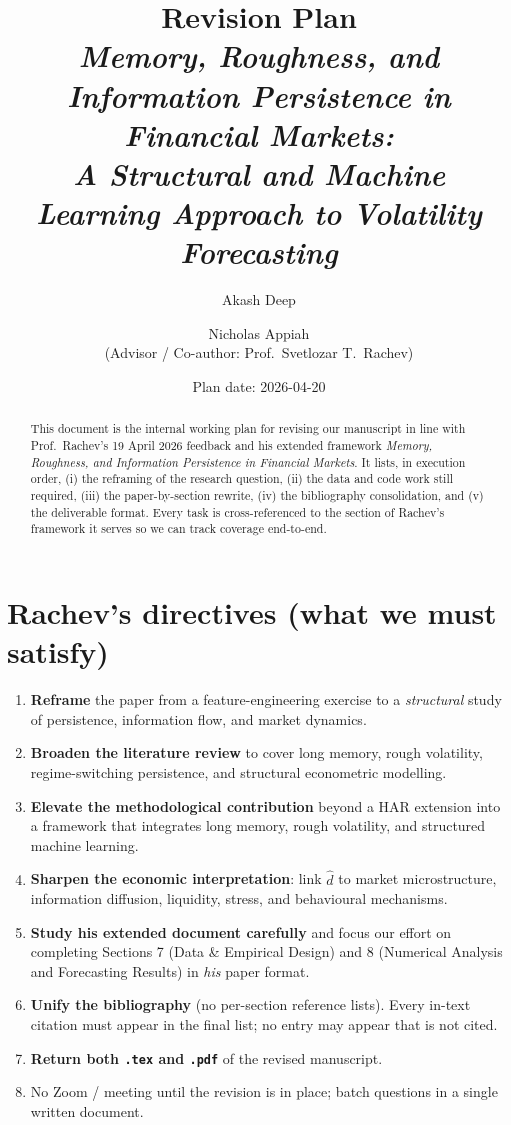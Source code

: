 \documentclass[11pt,a4paper]{article}
\title{\textbf{Revision Plan}\\[4pt]
\emph{Memory, Roughness, and Information Persistence in Financial Markets:\\
A Structural and Machine Learning Approach to Volatility Forecasting}}
\author{Akash Deep \and Nicholas Appiah \\[4pt]
\small (Advisor / Co-author: Prof.\ Svetlozar T.\ Rachev)}
\date{Plan date: 2026-04-20}
\begin{document}
\maketitle

\begin{abstract}
\noindent This document is the internal working plan for revising our manuscript in line
with Prof.\ Rachev's 19 April 2026 feedback and his extended framework
\emph{Memory, Roughness, and Information Persistence in Financial Markets}.
It lists, in execution order, (i) the reframing of the research question,
(ii) the data and code work still required, (iii) the paper-by-section
rewrite, (iv) the bibliography consolidation, and (v) the deliverable format.
Every task is cross-referenced to the section of Rachev's framework it
serves so we can track coverage end-to-end.
\end{abstract}

\tableofcontents

\section{Rachev's directives (what we must satisfy)}

\begin{enumerate}
  \item \textbf{Reframe} the paper from a feature-engineering exercise to a
  \emph{structural} study of persistence, information flow, and market
  dynamics.
  \item \textbf{Broaden the literature review} to cover long memory, rough
  volatility, regime-switching persistence, and structural econometric modelling.
  \item \textbf{Elevate the methodological contribution} beyond a HAR extension
  into a framework that integrates long memory, rough volatility, and
  structured machine learning.
  \item \textbf{Sharpen the economic interpretation}: link $\hat d$ to market
  microstructure, information diffusion, liquidity, stress, and behavioural
  mechanisms.
  \item \textbf{Study his extended document carefully} and focus our effort on
  completing Sections 7 (Data \& Empirical Design) and 8 (Numerical Analysis
  and Forecasting Results) in \emph{his} paper format.
  \item \textbf{Unify the bibliography} (no per-section reference lists).
  Every in-text citation must appear in the final list; no entry may appear
  that is not cited.
  \item \textbf{Return both \texttt{.tex} and \texttt{.pdf}} of the revised
  manuscript.
  \item No Zoom / meeting until the revision is in place; batch questions in a
  single written document.
\end{enumerate}
\end{document}
